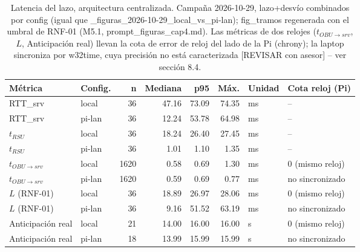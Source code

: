 \begin{table}[H]
\centering
\caption{Latencia del lazo, arquitectura centralizada. Campaña 2026-10-29, lazo+desvío combinados por config (igual que _figuras_2026-10-29_local_vs_pi-lan); fig_tramos regenerada con el umbral de RNF-01 (M5.1, prompt_figuras_cap4.md). Las métricas de dos relojes ($t_{OBU\to srv}$, $L$, Anticipación real) llevan la cota de error de reloj del lado de la Pi (chrony); la laptop sincroniza por w32time, cuya precisión no está caracterizada [REVISAR con asesor] -- ver sección 8.4.}
\label{tab:latencia_campana_centralizada}
\small
\begin{tabular}{llrrrrll}
\toprule
\textbf{Métrica} & \textbf{Config.} & \textbf{n} & \textbf{Mediana} & \textbf{p95} & \textbf{Máx.} & \textbf{Unidad} & \textbf{Cota reloj (Pi)} \\
\midrule
RTT\_srv & local & 36 & 47.16 & 73.09 & 74.35 & ms & -- \\
RTT\_srv & pi-lan & 36 & 12.24 & 53.78 & 64.98 & ms & -- \\
$t_{RSU}$ & local & 36 & 18.24 & 26.40 & 27.45 & ms & -- \\
$t_{RSU}$ & pi-lan & 36 & 1.01 & 1.10 & 1.35 & ms & -- \\
$t_{OBU\to srv}$ & local & 1620 & 0.58 & 0.69 & 1.30 & ms & 0 (mismo reloj) \\
$t_{OBU\to srv}$ & pi-lan & 1620 & 0.59 & 0.69 & 0.77 & ms & no sincronizado \\
$L$ (RNF-01) & local & 36 & 18.89 & 26.97 & 28.06 & ms & 0 (mismo reloj) \\
$L$ (RNF-01) & pi-lan & 36 & 9.16 & 51.52 & 63.19 & ms & no sincronizado \\
Anticipación real & local & 21 & 14.00 & 16.00 & 16.00 & s & 0 (mismo reloj) \\
Anticipación real & pi-lan & 18 & 13.99 & 15.99 & 15.99 & s & no sincronizado \\
\bottomrule
\end{tabular}
\end{table}
